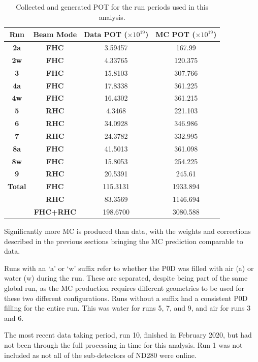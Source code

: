 \begin{center}
\begin{table}
\center
\large
\begin{tabular}{ c|c||c|c}
\hline
\hline
\textbf{Run} & \textbf{Beam Mode} & \textbf{Data POT ($\times10^{19}$)} & \textbf{MC POT ($\times10^{19}$)} \\
\hline
\hline
\textbf{2a} & \textbf{FHC} & 3.59457 & 167.99 \\
\textbf{2w} & \textbf{FHC} & 4.33765 & 120.375 \\
\hline
\textbf{3} & \textbf{FHC} & 15.8103 & 307.766 \\
\hline
\textbf{4a} & \textbf{FHC} & 17.8338 & 361.225 \\
\textbf{4w} & \textbf{FHC} & 16.4302 & 361.215 \\
\hline
\textbf{5} & \textbf{RHC} & 4.3468 & 221.103 \\
\hline
\textbf{6} & \textbf{RHC} & 34.0928 & 346.986 \\
\hline
\textbf{7} & \textbf{RHC} & 24.3782 & 332.995 \\
\hline
\textbf{8a} & \textbf{FHC} & 41.5013 & 361.098 \\
\textbf{8w} & \textbf{FHC} & 15.8053 & 254.225 \\
\hline
\textbf{9} & \textbf{RHC} & 20.5391 & 245.61 \\
\hline \hline
\textbf{Total} & \textbf{FHC}  & 115.3131 & 1933.894 \\ 
& \textbf{RHC} & 83.3569 & 1146.694 \\
& \textbf{FHC+RHC}  & 198.6700  & 3080.588 \\
\hline
\hline

\end{tabular}
\caption{Collected and generated POT for the run periods used in this analysis.}
\label{tab:pot}
\end{table}
\end{center}
\vspace{-0.8cm}

Significantly more MC is produced than data, with the weights and corrections described in the previous sections bringing the MC prediction comparable to data. 

Runs with an `a' or `w' suffix refer to whether the P0D was filled with air (a) or water (w) during the run. These are separated, despite being part of the same global run, as the MC production requires different geometries to be used for these two different configurations. Runs without a suffix had a consistent P0D filling for the entire run. This was water for runs 5, 7, and 9, and air for runs 3 and 6.

The most recent data taking period, run 10, finished in February 2020, but had not been through the full processing in time for this analysis. Run 1 was not included as not all of the sub-detectors of ND280 were online.

\newpage
